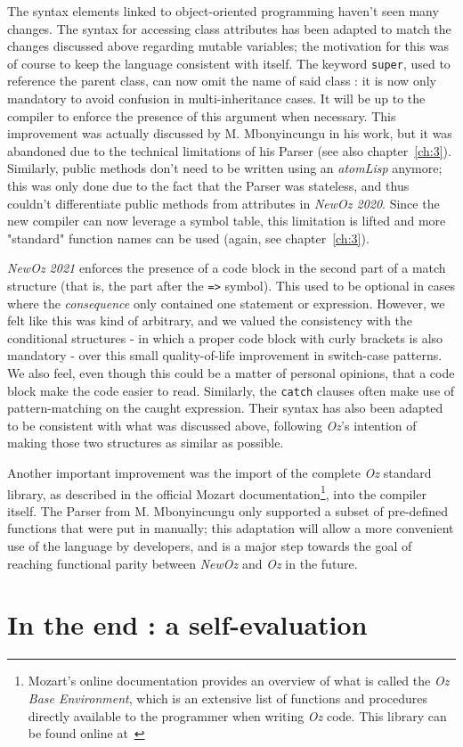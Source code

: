 The syntax elements linked to object-oriented programming haven't seen many changes.
The syntax for accessing class attributes has been adapted to match the changes discussed above regarding mutable variables;
the motivation for this was of course to keep the language consistent with itself.
The keyword \texttt{super}, used to reference the parent class, can now omit the name of said class : it is now only mandatory to avoid confusion in multi-inheritance cases.
It will be up to the compiler to enforce the presence of this argument when necessary.
This improvement was actually discussed by M. Mbonyincungu in his work, but it was abandoned due to the technical limitations of his Parser (see also chapter~\ref{ch:3}).\newline
Similarly, public methods don't need to be written using an \textit{atomLisp} anymore;
this was only done due to the fact that the Parser was stateless, and thus couldn't differentiate public methods from attributes in \textit{NewOz 2020}.
Since the new compiler can now leverage a symbol table, this limitation is lifted and more "standard" function names can be used (again, see chapter~\ref{ch:3}).\newline

\textit{NewOz 2021} enforces the presence of a code block in the second part of a match structure (that is, the part after the \texttt{=>} symbol).
This used to be optional in cases where the \textit{consequence} only contained one statement or expression.
However, we felt like this was kind of arbitrary, and we valued the consistency with the conditional structures - in which a proper code block with curly brackets is also mandatory - over this small quality-of-life improvement in switch-case patterns.
We also feel, even though this could be a matter of personal opinions, that a code block make the code easier to read.\newline
Similarly, the \texttt{catch} clauses often make use of pattern-matching on the caught expression.
Their syntax has also been adapted to be consistent with what was discussed above, following \textit{Oz}'s intention of making those two structures as similar as possible.\newline

Another important improvement was the import of the complete \textit{Oz} standard library, as described in the official Mozart documentation\footnote{Mozart's online documentation provides an overview of what is called the \textit{Oz Base Environment}, which is an extensive list of functions and procedures directly available to the programmer when writing \textit{Oz} code. This library can be found online at~\cite{mozart2doc}}, into the compiler itself.
The Parser from M. Mbonyincungu only supported a subset of pre-defined functions that were put in manually;
this adaptation will allow a more convenient use of the language by developers, and is a major step towards the goal of reaching functional parity between \textit{NewOz} and \textit{Oz} in the future.

\section{In the end : a self-evaluation}\label{sec:ch2-evaluation}